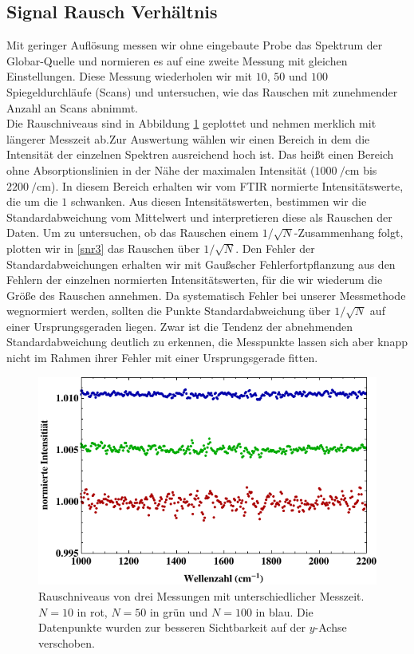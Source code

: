 \documentclass[paper=a4,fontsize=10pt,DIV=18,twocolumn,parskip=half]{scrartcl}
\numberwithin{equation}{section}    %
\begin{document}
\subsection{Signal Rausch Verhältnis}
Mit geringer Auflösung messen wir ohne eingebaute Probe das Spektrum der 
Globar-Quelle und normieren es auf eine zweite Messung mit gleichen 
Einstellungen. Diese Messung wiederholen wir mit $10$, $50$ und $100$ 
Spiegeldurchläufe (Scans) und untersuchen, wie das Rauschen mit zunehmender 
Anzahl an Scans abnimmt.\\
Die Rauschniveaus sind in Abbildung \ref{snr} geplottet und nehmen merklich mit längerer Messzeit ab.Zur Auswertung wählen wir einen Bereich in dem die Intensität der einzelnen 
Spektren ausreichend hoch ist. Das heißt einen Bereich ohne Absorptionslinien in 
der Nähe der maximalen Intensität ($\SI{1000}{\per\centi\meter}$ bis 
$\SI{2200}{\per\centi\meter}$). In diesem Bereich erhalten wir vom FTIR 
normierte Intensitätswerte, die um die $1$ schwanken. Aus diesen 
Intensitätswerten, bestimmen wir die Standardabweichung vom Mittelwert und 
interpretieren diese als Rauschen der Daten. Um zu untersuchen, ob das Rauschen 
einem $1/\sqrt{N}$-Zusammenhang folgt, plotten wir in \cref{snr3} das Rauschen 
über $1/\sqrt{N}$. Den Fehler der Standardabweichungen erhalten wir mit 
Gaußscher Fehlerfortpflanzung aus den Fehlern der einzelnen normierten 
Intensitätswerten, für die wir wiederum die Größe des Rauschen annehmen.
Da systematisch Fehler bei unserer Messmethode wegnormiert werden, sollten die Punkte Standardabweichung über $1/\sqrt{N}$ auf einer Ursprungsgeraden liegen. Zwar ist die Tendenz der abnehmenden Standardabweichung deutlich zu erkennen, die Messpunkte lassen sich aber knapp nicht im Rahmen ihrer Fehler mit einer Ursprungsgerade fitten.

\begin{figure}[htp]
	\begin{center}
		\includegraphics[width=\columnwidth]{Bilder/Rausch}
		\caption{Rauschniveaus von drei Messungen mit unterschiedlicher Messzeit. $N=10$ in rot, $N=50$ in grün und $N=100$ in blau. Die Datenpunkte wurden zur besseren Sichtbarkeit auf der $y$-Achse verschoben. }
		\label{snr}
	\end{center}
\end{figure}
\end{document}
